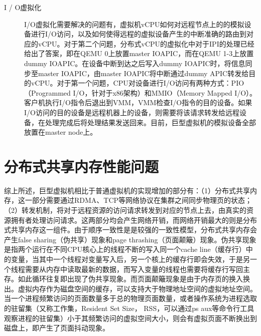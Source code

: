 \begin{description}
    \item[I / O虚拟化] I/O虚拟化需要解决的问题有，虚拟机vCPU如何对远程节点上的的模拟设备进行I/O访问，以及如何使得远程的虚拟设备产生的中断准确的路由到对应的vCPU。对于第二个问题，分布式vCPU的虚拟化中对于IPI的处理已经给出了答案，即在QEMU 0上放置master IOAPIC，而在QEMU 1-3上放置dummy IOAPIC。在设备中断到达之后写入dummy IOAPIC时，将信息同步至master IOAPIC，由master IOAPIC将中断通过dummy APIC转发给目的vCPU。对于第一个问题，CPU对设备进行I/O访问有两种方式：PIO（Programmed I/O，针对于x86架构）和MMIO（Memory Mapped I/O）。客户机执行I/O指令后退出到VMM，VMM检查I/O指令的目的设备。如果I/O访问的目的设备是远程机器上的设备，则需要将该请求转发给远程设备，在处理完成后将处理结果发送回来。目前，巨型虚拟机的模拟设备全部放置在master node上。
\end{description}

\section{分布式共享内存性能问题}
综上所述，巨型虚拟机相比于普通虚拟机的实现增加的部分有：（1）分布式共享内存，这一部分需要通过RDMA、TCP等网络协议在集群之间同步物理页的状态；（2）转发机制，将对于远程资源的访问请求转发到对应的节点上去，由真实的资源拥有者处理访问请求。这两部分均会产生网络开销，而网络开销最大的则是分布式共享内存这一组件。由于顺序一致性是是较强的一致性模型，分布式共享内存会产生false sharing（伪共享）现象和page thrashing（页面颠簸）现象\cite{sharing}。伪共享现象是指两个运行在不同CPU核心上的线程不断的写入同一个cache line（缓存行）中的变量，当其中一个线程对变量写入后，另一个核上的缓存行即会失效，于是另一个线程需要从内存中读取最新的数据，而写入变量的线程也需要将缓存行写回主存。如此循环往复即出现了伪共享现象。而页面颠簸现象是由于内存页的换入换出。虚拟内存作为磁盘空间的缓存，可以支持大于物理地址空间的虚拟地址空间。当一个进程频繁访问的页面数量多于总的物理页面数量，或者操作系统为进程选取的驻留集（又称工作集，Resident Set Size， RSS，可以通过ps aux等命令行工具观察进程的驻留集）小于其频繁访问的虚拟空间大小，则会有虚拟页面不断换出到磁盘上，即产生了页面抖动现象。

